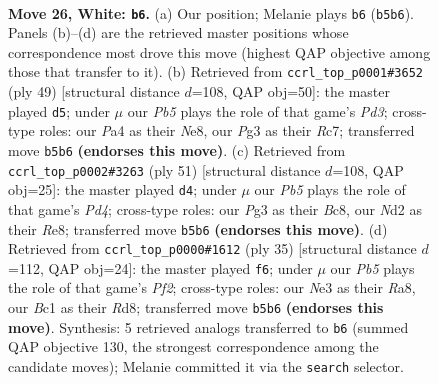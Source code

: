 \documentclass[11pt]{article}
\begin{document}
\clearpage

\begin{figure}[p]\centering
\begin{subfigure}{0.46\textwidth}\centering
\resizebox{\linewidth}{!}{%
\newchessgame
\chessboard[
  setfen={1n3r1k/r2b2b1/5n2/pP2p3/P1P3p1/4N1P1/3NRPB1/1RB3K1 w - - 1 26},
  showmover=false,
  pgfstyle=straightmove, color=movearrow, markmove={b5-b6}
]}
\caption{}
\end{subfigure}\hfill
\begin{subfigure}{0.46\textwidth}\centering
\resizebox{\linewidth}{!}{%
\newchessgame
\chessboard[
  setfen={2r1n1k1/2r1bppp/3pp1n1/1P6/4NP2/1P2P2P/1B1R2P1/1B1R2K1 b - - 0 25},
  showmover=false,
  pgfstyle=straightmove, color=movearrow, markmove={d6-d5}
]}
\caption{}
\end{subfigure}
\\[4pt]
\begin{subfigure}{0.46\textwidth}\centering
\resizebox{\linewidth}{!}{%
\newchessgame
\chessboard[
  setfen={r1b1r1k1/p1n2pb1/1p5p/2ppn3/5N2/PP3PN1/1BP3P1/2KR1B1R b - - 1 26},
  showmover=false,
  pgfstyle=straightmove, color=movearrow, markmove={d5-d4}
]}
\caption{}
\end{subfigure}\hfill
\begin{subfigure}{0.46\textwidth}\centering
\resizebox{\linewidth}{!}{%
\newchessgame
\chessboard[
  setfen={r1br1nk1/pp3pp1/1n6/2pp2NP/8/5N2/PPPB1PP1/2K1R2R b - - 0 18},
  showmover=false,
  pgfstyle=straightmove, color=movearrow, markmove={f7-f6}
]}
\caption{}
\end{subfigure}
\caption{\textbf{Move 26, White: \texttt{b6}.} (a) Our position; Melanie plays \texttt{b6} (\texttt{b5b6}). Panels (b)--(d) are the retrieved master positions whose correspondence most drove this move (highest QAP objective among those that transfer to it). (b) Retrieved from \texttt{ccrl\_top\_p0001\#3652} (ply 49) [structural distance $d$=108, QAP obj=50]: the master played \texttt{d5}; under $\mu$ our \emph{Pb5} plays the role of that game's \emph{Pd3}; cross-type roles: our \emph{P}a4 as their \emph{N}e8, our \emph{P}g3 as their \emph{R}c7; transferred move \texttt{b5b6} \textbf{(endorses this move)}. (c) Retrieved from \texttt{ccrl\_top\_p0002\#3263} (ply 51) [structural distance $d$=108, QAP obj=25]: the master played \texttt{d4}; under $\mu$ our \emph{Pb5} plays the role of that game's \emph{Pd4}; cross-type roles: our \emph{P}g3 as their \emph{B}c8, our \emph{N}d2 as their \emph{R}e8; transferred move \texttt{b5b6} \textbf{(endorses this move)}. (d) Retrieved from \texttt{ccrl\_top\_p0000\#1612} (ply 35) [structural distance $d$=112, QAP obj=24]: the master played \texttt{f6}; under $\mu$ our \emph{Pb5} plays the role of that game's \emph{Pf2}; cross-type roles: our \emph{N}e3 as their \emph{R}a8, our \emph{B}c1 as their \emph{R}d8; transferred move \texttt{b5b6} \textbf{(endorses this move)}. Synthesis: 5 retrieved analogs transferred to \texttt{b6} (summed QAP objective 130, the strongest correspondence among the candidate moves); Melanie committed it via the \texttt{search} selector.}
\label{fig:thought-m50}
\end{figure}
\end{document}
